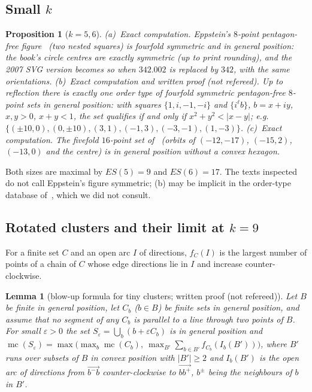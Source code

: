 \documentclass[10pt]{article}
\newtheorem{lemma}[theorem]{Lemma}
\newtheorem{proposition}[theorem]{Proposition}
\theoremstyle{definition}
\theoremstyle{remark}
\newcommand{\mc}{\operatorname{mc}}
\begin{document}
\subsection{Small \texorpdfstring{$k$}{k}}

\begin{proposition}[$k=5,6$]\label{prop:small}
(a)~\emph{Exact computation.} Eppstein's $8$-point pentagon-free figure~\cite[Fig.~1.2]{Epp18} (two nested squares) is
fourfold symmetric and in general position: the book's circle centres are exactly symmetric (up to print rounding), and
the 2007 SVG version becomes so when $342.002$ is replaced by $342$, with the same orientations.
(b)~\emph{Exact computation and written proof (not refereed).} Up to reflection there is exactly one order type of
fourfold symmetric pentagon-free $8$-point sets in general position: with squares $\{1,i,-1,-i\}$ and $\{i^\ell b\}$,
$b=x+iy$, $x,y>0$, $x+y<1$, the set qualifies if and only if $x^2+y^2<|x-y|$; e.g.\
$\{(\pm10,0),(0,\pm10),(3,1),(-1,3),(-3,-1),(1,-3)\}$.
(c)~\emph{Exact computation.} The fivefold $16$-point set of~\cite[Table~2]{SMQH25} (orbits of $(-12,-17)$, $(-15,2)$,
$(-13,0)$ and the centre) is in general position without a convex hexagon.
\end{proposition}

Both sizes are maximal by $ES(5)=9$ and $ES(6)=17$. The texts inspected do not call Eppstein's figure symmetric; (b) may
be implicit in the order-type database of~\cite{AAK02}, which we did not consult.

\subsection{Rotated clusters and their limit at \texorpdfstring{$k=9$}{k=9}}

For a finite set $C$ and an open arc $I$ of directions, $f_C(I)$ is the largest number of points of a chain of $C$
whose edge directions lie in $I$ and increase counter-clockwise.

\begin{lemma}[blow-up formula for tiny clusters; written proof (not refereed)]\label{lem:blowup}
Let $B$ be finite in general position, let $C_b$ ($b\in B$) be finite sets in general position, and assume that no
segment of any $C_b$ is parallel to a line through two points of $B$. For small $\varepsilon>0$ the set
$S_\varepsilon=\bigcup_b(b+\varepsilon C_b)$ is in general position and
$\mc(S_\varepsilon)=\max\bigl(\max_b\mc(C_b),\ \max_{B'}\sum_{b\in B'}f_{C_b}(I_b(B'))\bigr)$, where $B'$ runs over
subsets of $B$ in convex position with $|B'|\ge2$ and $I_b(B')$ is the open arc of directions from
$\overrightarrow{b^-b}$ counter-clockwise to $\overrightarrow{bb^+}$, $b^\pm$ being the neighbours of $b$ in $B'$.
\end{lemma}
\end{document}
